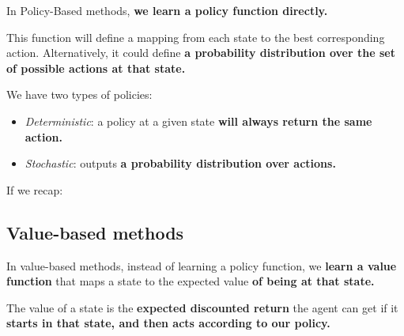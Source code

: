 \documentclass[11pt,a4paper]{article}
\begin{document}
In Policy-Based methods, \textbf{we learn a policy function directly.}

This function will define a mapping from each state to the best corresponding action. Alternatively, it could define \textbf{a probability distribution over the set of possible actions at that state.}


We have two types of policies:

\begin{itemize}
\tightlist
\item
  \emph{Deterministic}: a policy at a given state \textbf{will always return the same action.}
\end{itemize}



\begin{itemize}
\tightlist
\item
  \emph{Stochastic}: outputs \textbf{a probability distribution over actions.}
\end{itemize}



If we recap:



\subsection{Value-based methods}\label{value-based-methods}

In value-based methods, instead of learning a policy function, we \textbf{learn a value function} that maps a state to the expected value \textbf{of being at that state.}

The value of a state is the \textbf{expected discounted return} the agent can get if it \textbf{starts in that state, and then acts according to our policy.}
\end{document}

